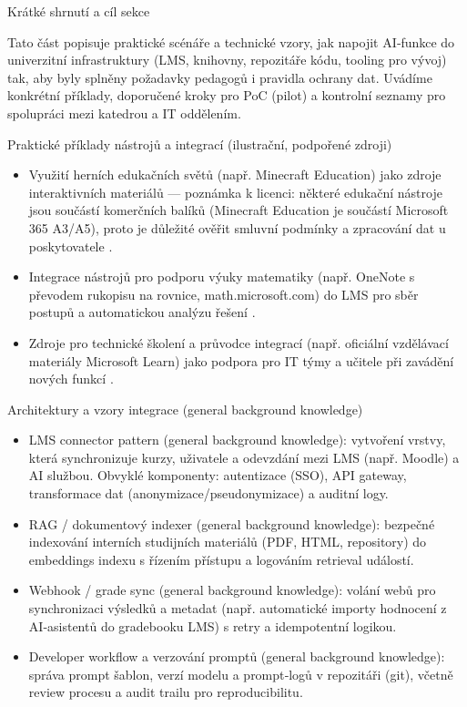 Krátké shrnutí a cíl sekce

Tato část popisuje praktické scénáře a technické vzory, jak napojit AI‑funkce do univerzitní infrastruktury (LMS, knihovny, repozitáře kódu, tooling pro vývoj) tak, aby byly splněny požadavky pedagogů i pravidla ochrany dat. Uvádíme konkrétní příklady, doporučené kroky pro PoC (pilot) a kontrolní seznamy pro spolupráci mezi katedrou a IT oddělením.

Praktické příklady nástrojů a integrací (ilustrační, podpořené zdroji)
\begin{itemize}
  \item Využití herních edukačních světů (např. Minecraft Education) jako zdroje interaktivních materiálů — poznámka k licenci: některé edukační nástroje jsou součástí komerčních balíků (Minecraft Education je součástí Microsoft 365 A3/A5), proto je důležité ověřit smluvní podmínky a zpracování dat u poskytovatele \cite{kb_ai_101_tipu_pdf_04e4a115_page_15_2}.
  \item Integrace nástrojů pro podporu výuky matematiky (např. OneNote s převodem rukopisu na rovnice, math.microsoft.com) do LMS pro sběr postupů a automatickou analýzu řešení \cite{kb_ai_101_tipu_pdf_04e4a115_page_8_1}.
  \item Zdroje pro technické školení a průvodce integrací (např. oficiální vzdělávací materiály Microsoft Learn) jako podpora pro IT týmy a učitele při zavádění nových funkcí \cite{kb_ai_101_tipu_pdf_04e4a115_page_54_1}.
\end{itemize}

Architektury a vzory integrace (general background knowledge)
\begin{itemize}
  \item LMS connector pattern (general background knowledge): vytvoření vrstvy, která synchronizuje kurzy, uživatele a odevzdání mezi LMS (např. Moodle) a AI službou. Obvyklé komponenty: autentizace (SSO), API gateway, transformace dat (anonymizace/pseudonymizace) a auditní logy.
  \item RAG / dokumentový indexer (general background knowledge): bezpečné indexování interních studijních materiálů (PDF, HTML, repository) do embeddings indexu s řízením přístupu a logováním retrieval událostí.
  \item Webhook / grade sync (general background knowledge): volání webů pro synchronizaci výsledků a metadat (např. automatické importy hodnocení z AI‑asistentů do gradebooku LMS) s retry a idempotentní logikou.
  \item Developer workflow a verzování promptů (general background knowledge): správa prompt šablon, verzí modelu a prompt‑logů v repozitáři (git), včetně review procesu a audit trailu pro reproducibilitu.
\end{itemize}


